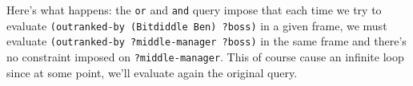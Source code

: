 \documentclass[a4paper,12pt]{article}
\begin{document}
Here's what happens: the \lstinline!or! and \lstinline!and! query
impose that each time we try to evaluate
\lstinline!(outranked-by (Bitdiddle Ben) ?boss)!  in a given frame,
we must evaluate \lstinline!(outranked-by ?middle-manager ?boss)!
in the same frame and there's no constraint imposed on
\lstinline!?middle-manager!.  This of course cause an infinite loop
since at some point, we'll evaluate again the original query.
\end{document}

